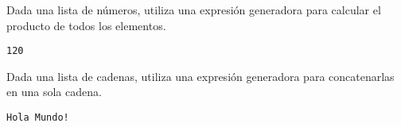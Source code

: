 \begin{exercise} Dada una lista de números, utiliza una expresión generadora para calcular el producto de todos los elementos.
\begin{Shaded}
\begin{Highlighting}[]
\OperatorTok{=}\NormalTok{ [}\NormalTok{, }\NormalTok{, }\NormalTok{, }\NormalTok{, }\NormalTok{]}
\OperatorTok{=}
\end{Highlighting}
\end{Shaded}

\begin{verbatim}
120

\end{verbatim}
\end{exercise}

\begin{exercise} Dada una lista de cadenas, utiliza una expresión generadora para concatenarlas en una sola cadena.
\begin{Shaded}
\begin{Highlighting}[]
\OperatorTok{=}\NormalTok{ [}\NormalTok{, }\NormalTok{, }\NormalTok{, }\NormalTok{]}
\OperatorTok{=} \StringTok{\textquotesingle{}\textquotesingle{}}
\end{Highlighting}
\end{Shaded}

\begin{verbatim}
Hola Mundo!

\end{verbatim}
\end{exercise}

